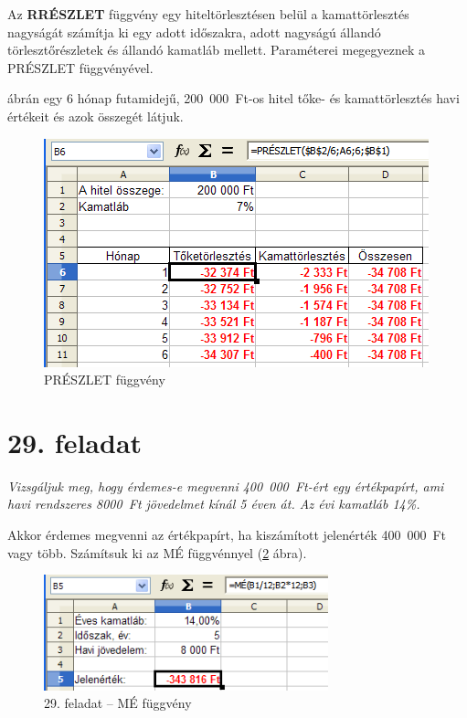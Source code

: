 Az \textbf{RRÉSZLET} függvény egy hiteltörlesztésen belül a
kamattörlesztés nagyságát számítja ki egy adott
időszakra, adott nagyságú állandó
törlesztőrészletek és állandó kamatláb mellett.
Paraméterei megegyeznek a PRÉSZLET függvényével.

 ábrán egy 6 hónap futamidejű, 200~000~Ft-os hitel
tőke- és kamattörlesztés havi értékeit és azok összegét látjuk.

\begin{figure}[!h]
\begin{center}
\includegraphics[width=11.137cm]{oocalcv2-img128.png}
\caption{PRÉSZLET függvény}\label{29-feladatPPMT}
\end{center}
\end{figure}

\section{29. feladat}

{\itshape
Vizsgáljuk meg, hogy érdemes-e megvenni 400~000~Ft-ért egy
értékpapírt, ami havi rendszeres 8000~Ft jövedelmet kínál 5
éven át. Az évi kamatláb 14\%.}

Akkor érdemes megvenni az értékpapírt, ha kiszámított
jelenérték 400~000~Ft vagy több. Számítsuk ki az MÉ
függvénnyel (\ref{29-feladatPV} ábra).

\begin{figure}[!h]
\begin{center}
\includegraphics[width=8.232cm]{oocalcv2-img126.png}
\caption{29.  feladat --  MÉ függvény}\label{29-feladatPV}
\end{center}
\end{figure}

